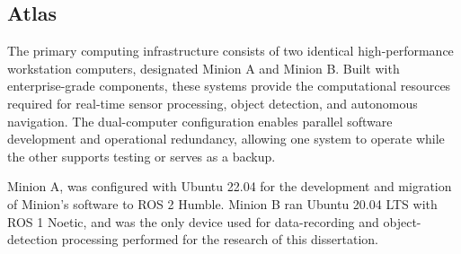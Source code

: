 \documentclass{erauthesis}
\begin{document}
\subsection{Atlas} \label{atlas}

The primary computing infrastructure consists of two identical high-performance workstation computers, designated Minion A and Minion B.  
Built with enterprise-grade components, these systems provide the computational resources required for real-time sensor processing, object detection, and autonomous navigation.  
The dual-computer configuration enables parallel software development and operational redundancy, allowing one system to operate while the other supports testing or serves as a backup.
 
Minion A, was configured with Ubuntu 22.04 for the development and migration of Minion's software to ROS 2 Humble. 
Minion B ran Ubuntu 20.04 LTS with ROS 1 Noetic, and was the only device used for data-recording and object-detection processing performed for the research of this dissertation.



\end{document}
